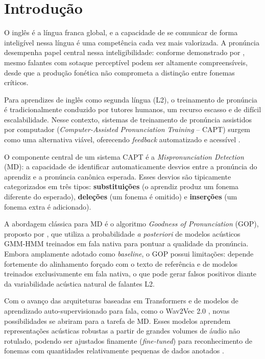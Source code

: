\documentclass[12pt]{article}
\begin{document}
\section{Introdução} \label{sec:intro}

O inglês é a língua franca global, e a capacidade de se comunicar de forma inteligível nessa língua é uma competência cada vez mais valorizada. A pronúncia desempenha papel central nessa inteligibilidade: conforme demonstrado por \cite{munro1995}, mesmo falantes com sotaque perceptível podem ser altamente compreensíveis, desde que a produção fonética não comprometa a distinção entre fonemas críticos.

Para aprendizes de inglês como segunda língua (L2), o treinamento de pronúncia é tradicionalmente conduzido por tutores humanos, um recurso escasso e de difícil escalabilidade. Nesse contexto, sistemas de treinamento de pronúncia assistidos por computador (\textit{Computer-Assisted Pronunciation Training} -- CAPT) surgem como uma alternativa viável, oferecendo \textit{feedback} automatizado e acessível \cite{witt2000}.

O componente central de um sistema CAPT é a \textit{Mispronunciation Detection} (MD): a capacidade de identificar automaticamente desvios entre a pronúncia do aprendiz e a pronúncia canônica esperada. Esses desvios são tipicamente categorizados em três tipos: \textbf{substituições} (o aprendiz produz um fonema diferente do esperado), \textbf{deleções} (um fonema é omitido) e \textbf{inserções} (um fonema extra é adicionado).

A abordagem clássica para MD é o algoritmo \textit{Goodness of Pronunciation} (GOP), proposto por \cite{witt2000}, que utiliza a probabilidade \textit{a posteriori} de modelos acústicos GMM-HMM treinados em fala nativa para pontuar a qualidade da pronúncia. Embora amplamente adotado como \textit{baseline}, o GOP possui limitações: depende fortemente do alinhamento forçado com o texto de referência e de modelos treinados exclusivamente em fala nativa, o que pode gerar falsos positivos diante da variabilidade acústica natural de falantes L2.

Com o avanço das arquiteturas baseadas em Transformers \cite{vaswani2017} e de modelos de aprendizado auto-supervisionado para fala, como o Wav2Vec 2.0 \cite{baevski2020}, novas possibilidades se abriram para a tarefa de MD. Esses modelos aprendem representações acústicas robustas a partir de grandes volumes de áudio não rotulado, podendo ser ajustados finamente (\textit{fine-tuned}) para reconhecimento de fonemas com quantidades relativamente pequenas de dados anotados \cite{xu2021}.
\end{document}
